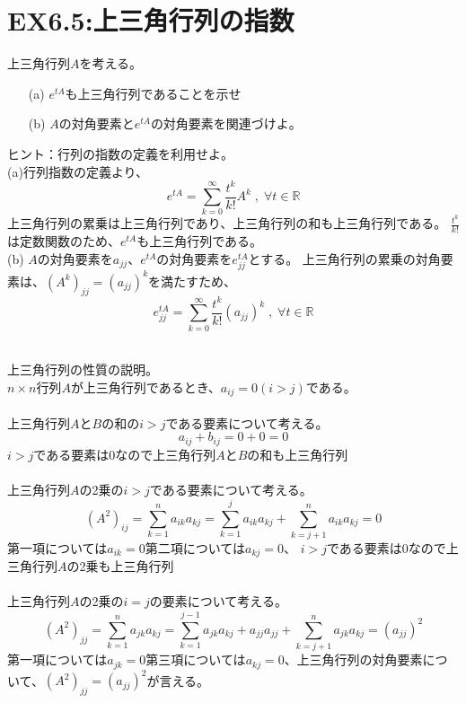 \documentclass{jsarticle}
\begin{document}
\section*{EX6.5:上三角行列の指数}
上三角行列$A$を考える。
\begin{itemize}
  \item[(a)] $e^{tA}$も上三角行列であることを示せ
  \item[(b)] $A$の対角要素と$e^{tA}$の対角要素を関連づけよ。
\end{itemize}
ヒント：行列の指数の定義を利用せよ。
\;\\
(a)行列指数の定義より、
\begin{equation}
  e^{tA} = \sum^{\infty}_{k=0} \frac{t^k}{k!}A^k \;,\;\forall t \in \mathbb{R} 
\end{equation}
上三角行列の累乗は上三角行列であり、上三角行列の和も上三角行列である。
$\frac{t^k}{k!}$は定数関数のため、$e^{tA}$も上三角行列である。\\
(b)\;\;
$A$の対角要素を$a_{jj}$、$e^{tA}$の対角要素を$e^{tA}_{jj}$とする。
上三角行列の累乗の対角要素は、${(A^k)}_{jj} = {(a_{jj})}^k$を満たすため、
\begin{equation}
  e^{tA}_{jj} = \sum^{\infty}_{k=0} \frac{t^k}{k!}{(a_{jj})}^k \;,\;\forall t \in \mathbb{R} 
\end{equation}

\;\\

上三角行列の性質の説明。\\
$n\times n$行列$A$が上三角行列であるとき、$a_{ij} = 0 (i>j)$である。\\
\;\\
上三角行列$A$と$B$の和の$i>j$である要素について考える。
\begin{equation}
  a_{ij} + b_{ij} = 0+0 = 0
\end{equation}
$i>j$である要素は0なので上三角行列$A$と$B$の和も上三角行列\\
\;\\
上三角行列$A$の2乗の$i>j$である要素について考える。
\begin{equation}
  {(A^2)}_{ij} = \sum^n_{k=1} a_{ik}a_{kj} = \sum^j_{k=1}  a_{ik}a_{kj} + \sum^n_{k=j+1}  a_{ik}a_{kj} = 0
\end{equation}
第一項については$a_{ik} = 0$第二項については$a_{kj}=0$、
$i>j$である要素は0なので上三角行列$A$の2乗も上三角行列\\
\;\\
上三角行列$A$の2乗の$i=j$の要素について考える。
\begin{equation}
  {(A^2)}_{jj} = \sum^n_{k=1} a_{jk}a_{kj} = \sum^{j-1}_{k=1}  a_{jk}a_{kj} +a_{jj}a_{jj}+ \sum^n_{k=j+1}  a_{jk}a_{kj} = {(a_{jj})}^2
\end{equation}
第一項については$a_{jk} = 0$第三項については$a_{kj}=0$、上三角行列の対角要素について、${(A^2)}_{jj}={(a_{jj})}^2$が言える。
\end{document}
